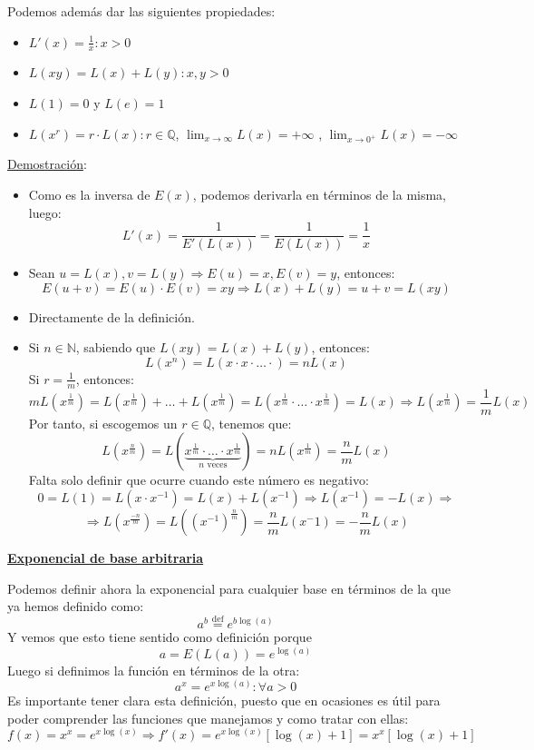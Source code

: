 \documentclass[10pt,a4paper,openright]{book}
\theoremstyle{break}
\begin{document}
Podemos además dar las siguientes propiedades:
\begin{itemize}
\item $L'(x) = \frac{1}{x} : x > 0$
\item $L(xy) = L(x) +L(y) : x,y > 0$
\item $L(1) = 0 \mbox{ y } L(e) = 1$
\item $L(x^r) = r\cdot L(x) : r \in \mathbb{Q}$, $\lim_{x \to \infty} L(x) = + \infty$ , $\lim_{x \to 0^+} L(x) = - \infty$
\end{itemize}
\underline{Demostración}:
\begin{itemize}
\item Como es la inversa de $E(x)$, podemos derivarla en términos de la misma, luego:
$$L'(x) = \frac{1}{E'(L(x))} = \frac{1}{E(L(x))} = \frac{1}{x}$$
\item Sean $u = L(x), v= L(y)\Rightarrow E(u) = x, E(v) = y $, entonces:
$$E(u+v) = E(u) \cdot E(v) = xy \Rightarrow L(x) + L(y) = u+v = L(xy)$$
\item Directamente de la definición.
\item Si $n \in \mathbb{N}$, sabiendo que $L(xy) = L(x) +L(y)$, entonces:
$$L(x^n) = L(x \cdot x \cdot \ldots \cdot ) = n L(x)$$
Si $r = \frac{1}{m}$, entonces:
$$mL(x^\frac{1}{m}) = L(x^\frac{1}{m}) + \ldots + L(x^\frac{1}{m}) =L(x^\frac{1}{m} \cdot \ldots \cdot x^\frac{1}{m}) = L(x) \Rightarrow L(x^\frac{1}{m}) = \frac{1}{m} L(x)$$
Por tanto, si escogemos un $r\in \mathbb Q$, tenemos que:
$$L(x^\frac{n}{m}) = L(\underbrace{x^\frac{1}{m} \cdot \ldots \cdot x^\frac{1}{m}}_{n \mbox{ veces}}) = n L(x^\frac{1}{m}) = \frac{n}{m} L(x)$$
Falta solo definir que ocurre cuando este número es negativo:
$$0 = L(1) = L(x \cdot x^{-1}) = L(x) + L(x^{-1}) \Rightarrow L(x^{-1}) = - L(x) \Rightarrow $$
$$\Rightarrow L(x^\frac{-n}{m}) = L((x^{-1})^\frac{n}{m}) = \frac{n}{m} L(x^-1) = -\frac{n}{m} L(x)$$
\end{itemize}

\underline{\textbf{Exponencial de base arbitraria}}

Podemos definir ahora la exponencial para cualquier base en términos de la que ya hemos definido como:
$$a^b \overset{\mbox{def}}{=} e^{b \log(a)}$$
Y vemos que esto tiene sentido como definición porque
$$a = E(L(a)) = e^{\log(a)}$$
Luego si definimos la función en términos de la otra:
$$a^x = e^{x \log(a)}: \forall a > 0$$
Es importante tener clara esta definición, puesto que en ocasiones es útil para poder comprender las funciones que manejamos y como tratar con ellas:
$$f(x) = x^x = e^{x \log(x)} \Rightarrow f'(x) = e^{x \log(x)} [\log(x) + 1] = x^x  [\log(x) + 1]$$
\end{document}
